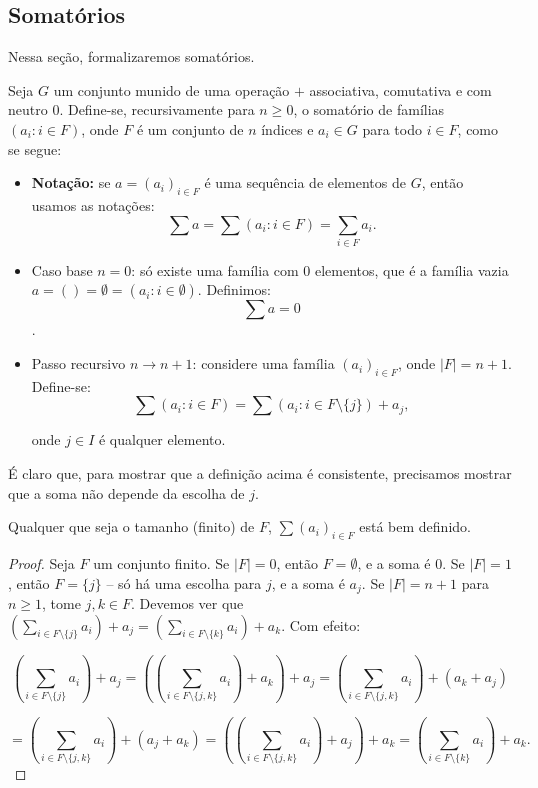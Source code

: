 \subsection{Somatórios}

Nessa seção, formalizaremos somatórios.

\begin{definition}
Seja $G$ um conjunto munido de uma operação $+$ associativa, comutativa e com neutro $0$. Define-se, recursivamente para $n\geq 0$, o somatório de famílias $(a_i: i \in F)$, onde $F$ é um conjunto de $n$ índices e $a_i \in G$ para todo $i \in F$, como se segue:

\begin{itemize}
\item \textbf{Notação:} se $a=(a_i)_{i\in F}$ é uma sequência de elementos de $G$, então usamos as notações:
$$\sum a=\sum(a_i: i\in F)=\sum_{i\in F} a_i.$$
\item Caso base $n=0$: só existe uma família com $0$ elementos, que é a família vazia $a=()=\emptyset=(a_i:i\in \emptyset)$. Definimos: $$\sum a=0$$.
\item Passo recursivo $n\rightarrow n+1$: considere uma família $(a_i)_{i\in F}$, onde $|F|=n+1$. Define-se:
$$\sum(a_i: i \in F)=\sum(a_i: i \in F\setminus\{j\})+a_j,$$

onde $j \in I$ é qualquer elemento.
\end{itemize}
\end{definition}
É claro que, para mostrar que a definição acima é consistente, precisamos mostrar que a soma não depende da escolha de $j$.

\begin{lemma}
Qualquer que seja o tamanho (finito) de $F$, $\sum(a_i)_{i\in F}$ está bem definido.
\end{lemma}

\begin{proof}
    Seja $F$ um conjunto finito. Se $|F|=0$, então $F=\emptyset$, e a soma é $0$. Se $|F|=1$, então $F=\{j\}$ -- só há uma escolha para $j$, e a soma é $a_j$. Se $|F|=n+1$ para $n\geq 1$, tome $j, k \in F$. Devemos ver que $\left(\sum_{i\in F\setminus\{j\}} a_i\right)+a_j=\left(\sum_{i\in F\setminus\{k\}} a_i\right)+a_k$. Com efeito:

    $$\left(\sum_{i\in F\setminus\{j\}} a_i\right)+a_j=\left(\left(\sum_{i\in F\setminus\{j, k\}} a_i\right)+a_k\right)+a_j=\left(\sum_{i\in F\setminus\{j, k\}} a_i\right)+(a_k+a_j)$$

        $$=\left(\sum_{i\in F\setminus\{j, k\}} a_i\right)+(a_j+a_k)=\left(\left(\sum_{i\in F\setminus\{j, k\}} a_i\right)+a_j\right)+a_k=\left(\sum_{i\in F\setminus\{k\}} a_i\right)+a_k.$$
\end{proof}

